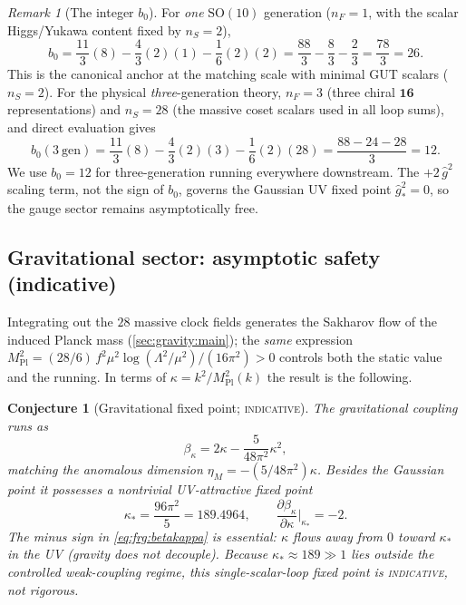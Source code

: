 \documentclass[11pt]{article}
\theoremstyle{plain}
\newtheorem{conjecture}[theorem]{Conjecture}
\theoremstyle{definition}
\theoremstyle{remark}
\newtheorem{remark}[theorem]{Remark}
\begin{document}
\begin{remark}[The integer $b_{0}$]
\label{rem:frg:b0}
For \emph{one} $\mathrm{SO}(10)$ generation ($n_{F}=1$, with the scalar
Higgs/Yukawa content fixed by $n_{S}=2$),
\begin{equation}\label{eq:frg:b0one}
  b_{0}
  =\frac{11}{3}(8)-\frac43(2)(1)-\frac16(2)(2)
  =\frac{88}{3}-\frac{8}{3}-\frac{2}{3}
  =\frac{78}{3}=26 .
\end{equation}
This is the canonical anchor at the matching scale with minimal GUT scalars
($n_{S}=2$). For the physical \emph{three}-generation theory, $n_{F}=3$
(three chiral $\mathbf{16}$ representations) and $n_{S}=28$ (the massive
coset scalars used in all loop sums), and direct evaluation gives
\begin{equation}\label{eq:frg:b0three}
  b_{0}(3\ \text{gen})
  =\frac{11}{3}(8)-\frac43(2)(3)-\frac16(2)(28)
  =\frac{88-24-28}{3}=12 .
\end{equation}
We use $b_{0}=12$ for three-generation running everywhere downstream. The
$+2\,\hat g^{2}$ scaling term, not the sign of $b_{0}$, governs the Gaussian
UV fixed point $\hat g^{2}_{\ast}=0$, so the gauge sector remains
asymptotically free.
\end{remark}

\subsection{Gravitational sector: asymptotic safety (indicative)}
\label{sec:frg:gravity}

Integrating out the $28$ massive clock fields generates the Sakharov flow
of the induced Planck mass (\autoref{sec:gravity:main}); the \emph{same}
expression $M_{\mathrm{Pl}}^{2}=(28/6)\,f^{2}\mu^{2}\log(\Lambda^{2}/\mu^{2})/(16\pi^{2})>0$
controls both the static value and the running. In terms of
$\kappa=k^{2}/M_{\mathrm{Pl}}^{2}(k)$ the result is the following.

\begin{conjecture}[Gravitational fixed point; \textsc{indicative}]
\label{conj:frg:gravity}
The gravitational coupling runs as
\begin{equation}\label{eq:frg:betakappa}
  \beta_{\kappa}=2\kappa-\frac{5}{48\pi^{2}}\kappa^{2},
\end{equation}
matching the anomalous dimension $\eta_{M}=-(5/48\pi^{2})\kappa$. Besides
the Gaussian point it possesses a nontrivial UV-attractive fixed point
\begin{equation}\label{eq:frg:kappastar}
  \kappa_{\ast}=\frac{96\pi^{2}}{5}=189.4964,
  \qquad
  \frac{\partial\beta_{\kappa}}{\partial\kappa}\bigg|_{\kappa_{\ast}}=-2 .
\end{equation}
The \emph{minus} sign in \eqref{eq:frg:betakappa} is essential: $\kappa$
flows \emph{away} from $0$ toward $\kappa_{\ast}$ in the UV (gravity does
\emph{not} decouple). Because $\kappa_{\ast}\approx189\gg1$ lies outside
the controlled weak-coupling regime, this single-scalar-loop fixed point is
\textsc{indicative}, not rigorous.
\end{conjecture}
\end{document}
